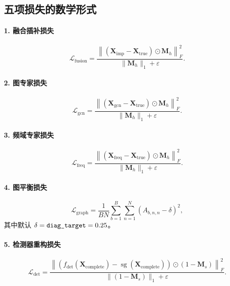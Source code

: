 \documentclass[UTF8]{ctexart}
\begin{document}
\subsection{五项损失的数学形式}

\paragraph{1. 融合插补损失}
\begin{equation}
    \mathcal{L}_{\text{fusion}}
    =
    \frac{
        \left\|
            \left(\bm{X}_{\text{imp}} - \bm{X}_{\text{true}}\right)\odot \bm{M}_h
        \right\|_F^2
    }{
        \|\bm{M}_h\|_1 + \varepsilon
    }.
\end{equation}

\paragraph{2. 图专家损失}
\begin{equation}
    \mathcal{L}_{\text{gcn}}
    =
    \frac{
        \left\|
            \left(\bm{X}_{\text{gcn}} - \bm{X}_{\text{true}}\right)\odot \bm{M}_h
        \right\|_F^2
    }{
        \|\bm{M}_h\|_1 + \varepsilon
    }.
\end{equation}

\paragraph{3. 频域专家损失}
\begin{equation}
    \mathcal{L}_{\text{freq}}
    =
    \frac{
        \left\|
            \left(\bm{X}_{\text{freq}} - \bm{X}_{\text{true}}\right)\odot \bm{M}_h
        \right\|_F^2
    }{
        \|\bm{M}_h\|_1 + \varepsilon
    }.
\end{equation}

\paragraph{4. 图平衡损失}
\begin{equation}
    \mathcal{L}_{\text{graph}}
    =
    \frac{1}{BN}
    \sum_{b=1}^{B}\sum_{n=1}^{N}
    \left(A_{b,n,n} - \delta\right)^2,
\end{equation}
其中默认 \(\delta=\verb|diag_target|=0.25\)。

\paragraph{5. 检测器重构损失}
\begin{equation}
    \mathcal{L}_{\text{det}}
    =
    \frac{
        \left\|
            \left(
                f_{\text{det}}(\bm{X}_{\text{complete}})
                -
                \operatorname{sg}(\bm{X}_{\text{complete}})
            \right)
            \odot
            (1-\bm{M}_s)
        \right\|_F^2
    }{
        \|(1-\bm{M}_s)\|_1 + \varepsilon
    }.
\end{equation}
\end{document}
